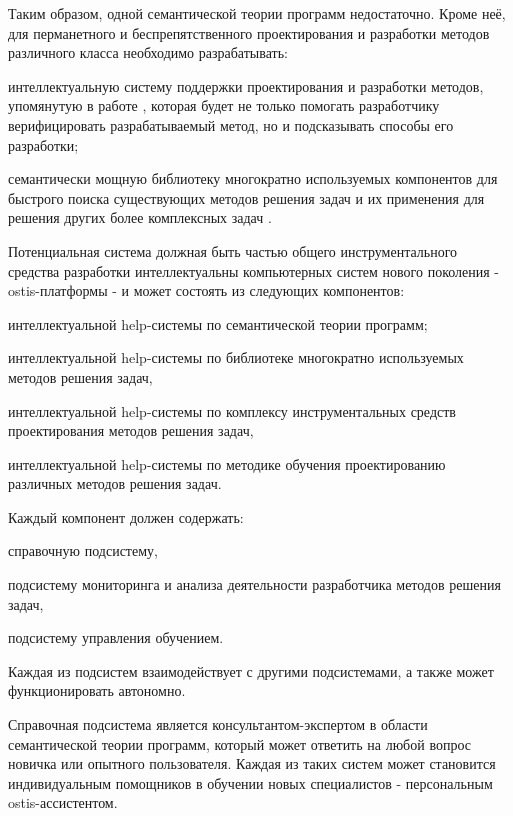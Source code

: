 Таким образом, одной семантической теории программ недостаточно. Кроме неё, для перманетного и беспрепятственного проектирования и разработки методов различного класса необходимо разрабатывать:
\begin{textitemize}
	\item интеллектуальную систему поддержки проектирования и разработки методов, упомянутую в работе \cite{Gulakina2012}, которая будет не только помогать разработчику верифицировать разрабатываемый метод, но и подсказывать способы его разработки;
	\item семантически мощную библиотеку многократно используемых компонентов \cite{Ford2019} для быстрого поиска существующих методов решения задач и их применения для решения других более комплексных задач \cite{sales2022explainable}.
\end{textitemize}

Потенциальная система должная быть частью общего инструментального средства разработки интеллектуальны компьютерных систем нового поколения - ostis-платформы \cite{Platform2021} - и может состоять из следующих компонентов:
\begin{textitemize}
	\item интеллектуальной help-системы по семантической теории программ;
	\item интеллектуальной help-системы по библиотеке многократно используемых методов решения задач,
	\item интеллектуальной help-системы по комплексу инструментальных средств проектирования  методов решения задач,
	\item интеллектуальной help-системы по методике обучения проектированию различных методов решения задач.
\end{textitemize}

Каждый компонент должен содержать:
\begin{textitemize}
	\item справочную подсистему,
	\item подсистему мониторинга и анализа деятельности разработчика методов решения задач,
	\item подсистему управления обучением.
\end{textitemize}

Каждая из подсистем взаимодействует с другими подсистемами, а также может функционировать автономно.

Справочная подсистема является консультантом-экспертом в области семантической теории программ, который может ответить на любой вопрос новичка или опытного пользователя. Каждая из таких систем может становится индивидуальным помощников в обучении новых специалистов - персональным ostis-ассистентом.

